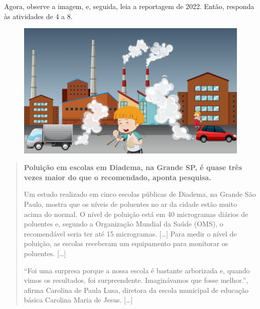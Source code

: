 
\pagebreak
\noindent{}Agora, observe a imagem, e, seguida, leia a reportagem de 2022. Então, responda às atividades de 4 a 8.

\begin{figure}[htpb!]
\includegraphics[width=\textwidth]{./imgs/img34.png}
\end{figure}

\begin{quote}
\textbf{Poluição em escolas em Diadema, na Grande SP, é quase três vezes maior
do que o recomendado, aponta pesquisa.}

Um estudo realizado em cinco escolas públicas de Diadema, na Grande São
Paulo, mostra que os níveis de poluentes no ar da cidade estão muito
acima do normal. O nível de poluição está em 40 microgramas diários de
poluentes e, segundo a Organização Mundial da Saúde (OMS), o
recomendável seria ter até 15 microgramas. {[}\ldots{}{]} Para medir o nível de
poluição, as escolas receberam um equipamento para monitorar os
poluentes. {[}\ldots{}{]}

“Foi uma surpresa porque a nossa escola é bastante arborizada e, quando
vimos os resultados, foi surpreendente. Imaginávamos que fosse melhor.”,
afirma Carolina de Paula Lusa, diretora da escola municipal de educação
básica Carolina Maria de Jesus. {[}\ldots{}{]}

\end{quote}

